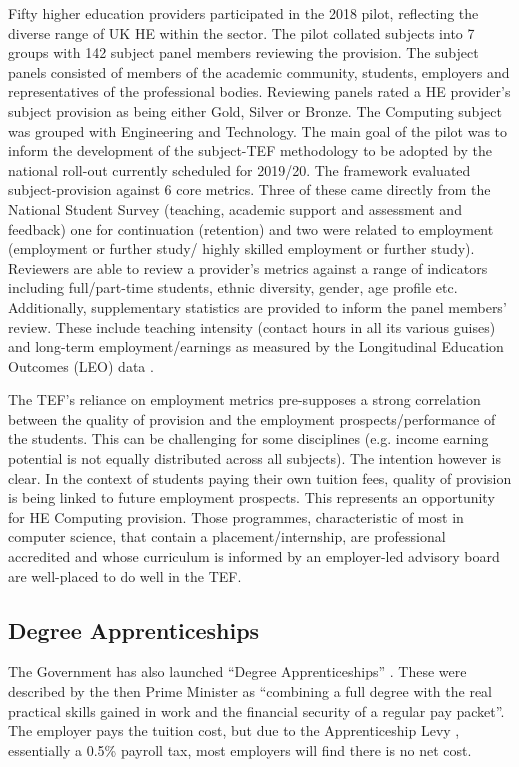 \documentclass[sigconf]{acmart}
\begin{document}
Fifty higher education providers participated in the 2018 pilot, reflecting the diverse range of UK HE within the sector. The pilot collated subjects into 7 groups with 142 subject panel members reviewing the provision. The subject panels consisted of members of the academic community, students, employers and representatives of the professional bodies. Reviewing panels rated a HE provider's subject provision as being either Gold, Silver or Bronze. The Computing subject was grouped with Engineering and Technology. The main goal of the pilot was to inform the development of the subject-TEF methodology to be adopted by the national roll-out currently scheduled for 2019/20. The framework evaluated subject-provision against 6 core metrics. Three of these came directly from the National Student Survey (teaching, academic support and assessment and feedback) one for continuation (retention) and two were related to employment (employment or further study/ highly skilled employment or further study). Reviewers are able to review a provider's metrics against a range of indicators %
including full/part-time students, ethnic diversity, gender, age profile etc. Additionally, supplementary statistics are provided to inform the panel members' review. These include teaching intensity (contact hours in all its various guises) and long-term employment/earnings as measured by the Longitudinal Education Outcomes (LEO) data \cite{DfE2017a}.

The TEF's reliance on employment metrics pre-supposes a strong correlation between the quality of provision and the employment prospects/performance of the students. This can be challenging for some disciplines (e.g. income earning potential is not equally distributed across all subjects). The intention however is clear. In the context of students paying their own tuition fees, quality of provision is being linked to future employment prospects. This represents an opportunity for HE Computing provision. Those programmes, characteristic of most in computer science,  that contain a placement/internship, are professional accredited and whose curriculum is informed by an employer-led advisory board are well-placed to do well in the TEF. 



\subsection{Degree Apprenticeships}

The Government has also launched ``Degree Apprenticeships''
\cite{BIS2015a}. These were described by the then Prime Minister as
``combining a full degree with the real practical skills gained in
work and the financial security of a regular pay packet''. The
employer pays the tuition cost, but due to the Apprenticeship Levy
\cite{HMRC2016a}, essentially a 0.5\% payroll tax, most employers will find there is no net cost.
\end{document}
